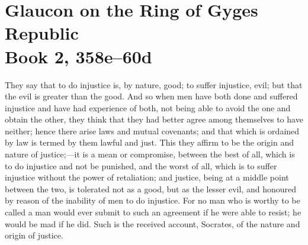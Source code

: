 
\author{Plato}
\chapter[Plato -- Glaucon on the Ring of Gyges]{Glaucon on the Ring of
Gyges\\\smaller Republic\\\smaller Book 2, 358e--60d}



They say that to do injustice is, by nature, good; to suffer
injustice, evil; but that the evil is greater than the good. And so
when men have both done and suffered injustice and have had experience
of both, not being able to avoid the one and obtain the other, they
think that they had better agree among themselves to have neither;
hence there arise laws and mutual covenants; and that which is
ordained by law is termed by them lawful and just. This they affirm to
be the origin and nature of jus\-tice;---it is a mean or compromise,
between the best of all, which is to do injustice and not be punished,
and the worst of all, which is to suffer injustice without the power
of retaliation; and justice, being at a middle point between the two,
is tolerated not as a good, but as the lesser evil, and honoured by
reason of the inability of men to do injustice. For no man who is
worthy to be called a man would ever submit to such an agreement if he
were able to resist; he would be mad if he did. Such is the received
account, Socrates, of the nature and origin of justice.

